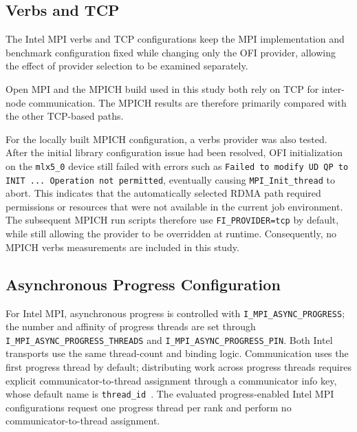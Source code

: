 \subsection{Verbs and TCP}

The Intel MPI verbs and TCP configurations keep the MPI implementation and benchmark configuration fixed while changing only the OFI provider, allowing the effect of provider selection to be examined separately.

Open MPI and the MPICH build used in this study both rely on TCP for inter-node communication. The MPICH results are therefore primarily compared with the other TCP-based paths.

For the locally built MPICH configuration, a verbs provider was also tested. After the initial library configuration issue had been resolved, OFI initialization on the \texttt{mlx5\_0} device still failed with errors such as \texttt{Failed to modify UD QP to INIT ... Operation not permitted}, eventually causing \texttt{MPI\_Init\_thread} to abort. This indicates that the automatically selected RDMA path required permissions or resources that were not available in the current job environment. The subsequent MPICH run scripts therefore use \texttt{FI\_PROVIDER=tcp} by default, while still allowing the provider to be overridden at runtime. Consequently, no MPICH verbs measurements are included in this study.


\subsection{Asynchronous Progress Configuration}
\label{sec:async-progress-configuration}

For Intel MPI, asynchronous progress is controlled with
\texttt{I\_MPI\_}\allowbreak\texttt{ASYNC\_}\allowbreak\texttt{PROGRESS}; the number and affinity
of progress threads are set through
\texttt{I\_MPI\_}\allowbreak\texttt{ASYNC\_}\allowbreak\texttt{PROGRESS\_}\allowbreak\texttt{THREADS} and
\texttt{I\_MPI\_}\allowbreak\texttt{ASYNC\_}\allowbreak\texttt{PROGRESS\_PIN}.
Both Intel transports use the same thread-count and binding logic.
Communication uses the first progress thread by default; distributing work
across progress threads requires explicit communicator-to-thread assignment
through a communicator info key, whose default name is
\texttt{thread\_id}~\cite{intelAsyncProgressControl,intelAsyncProgressGuide}.
The evaluated progress-enabled Intel MPI configurations request one
progress thread per rank and perform no communicator-to-thread assignment.

